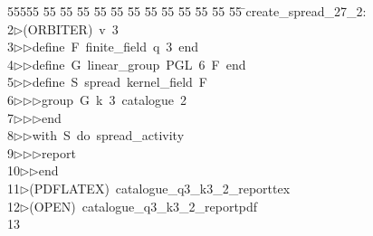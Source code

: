 %
%
\begin{tabbing}
55555 \= 55 \= 55 \= 55 \= 55 \= 55 \= 55 \= 55 \= 55 \= 55 \= 55 \= 55 \= 55 \= \>create\_spread\_27\_2:\\[0pt]
2\>$\triangleright$\>(ORBITER)\ v\ 3\ \\[0pt]
3\>$\triangleright$\>$\triangleright$\>define\ F\ finite\_field\ q\ 3\ end\ \\[0pt]
4\>$\triangleright$\>$\triangleright$\>define\ G\ linear\_group\ PGL\ 6\ F\ end\ \\[0pt]
5\>$\triangleright$\>$\triangleright$\>define\ S\ spread\ kernel\_field\ F\ \\[0pt]
6\>$\triangleright$\>$\triangleright$\>$\triangleright$\>group\ G\ k\ 3\ catalogue\ 2\ \\[0pt]
7\>$\triangleright$\>$\triangleright$\>$\triangleright$\>end\ \\[0pt]
8\>$\triangleright$\>$\triangleright$\>with\ S\ do\ spread\_activity\ \\[0pt]
9\>$\triangleright$\>$\triangleright$\>$\triangleright$\>report\ \\[0pt]
10\>$\triangleright$\>$\triangleright$\>end\\[0pt]
11\>$\triangleright$\>(PDFLATEX)\ catalogue\_q3\_k3\_2\_reporttex\\[0pt]
12\>$\triangleright$\>(OPEN)\ catalogue\_q3\_k3\_2\_reportpdf\\[0pt]
13\>\end{tabbing}
